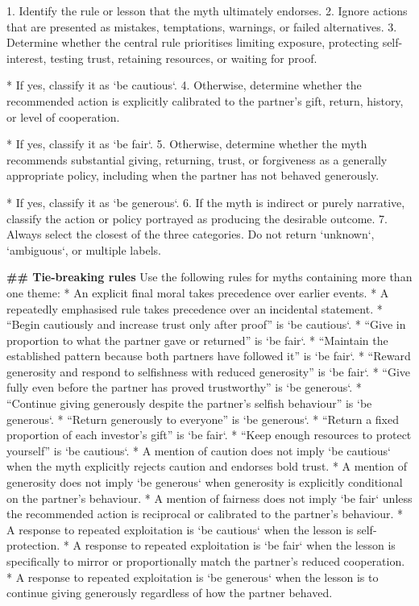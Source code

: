 \begin{promptboxcompact}
1. Identify the rule or lesson that the myth ultimately endorses. 2. Ignore actions that are presented as mistakes, temptations, warnings, or failed alternatives. 3. Determine whether the central rule prioritises limiting exposure, protecting self-interest, testing trust, retaining resources, or waiting for proof.

* If yes, classify it as `be cautious`. 4. Otherwise, determine whether the recommended action is explicitly calibrated to the partner’s gift, return, history, or level of cooperation.

* If yes, classify it as `be fair`. 5. Otherwise, determine whether the myth recommends substantial giving, returning, trust, or forgiveness as a generally appropriate policy, including when the partner has not behaved generously.

* If yes, classify it as `be generous`. 6. If the myth is indirect or purely narrative, classify the action or policy portrayed as producing the desirable outcome. 7. Always select the closest of the three categories. Do not return `unknown`, `ambiguous`, or multiple labels.

\textbf{\#\# Tie-breaking rules} Use the following rules for myths containing more than one theme: * An explicit final moral takes precedence over earlier events. * A repeatedly emphasised rule takes precedence over an incidental statement. * “Begin cautiously and increase trust only after proof” is `be cautious`. * “Give in proportion to what the partner gave or returned” is `be fair`. * “Maintain the established pattern because both partners have followed it” is `be fair`. * “Reward generosity and respond to selfishness with reduced generosity” is `be fair`. * “Give fully even before the partner has proved trustworthy” is `be generous`. * “Continue giving generously despite the partner’s selfish behaviour” is `be generous`. * “Return generously to everyone” is `be generous`. * “Return a fixed proportion of each investor’s gift” is `be fair`. * “Keep enough resources to protect yourself” is `be cautious`. * A mention of caution does not imply `be cautious` when the myth explicitly rejects caution and endorses bold trust. * A mention of generosity does not imply `be generous` when generosity is explicitly conditional on the partner’s behaviour. * A mention of fairness does not imply `be fair` unless the recommended action is reciprocal or calibrated to the partner’s behaviour. * A response to repeated exploitation is `be cautious` when the lesson is self-protection. * A response to repeated exploitation is `be fair` when the lesson is specifically to mirror or proportionally match the partner’s reduced cooperation. * A response to repeated exploitation is `be generous` when the lesson is to continue giving generously regardless of how the partner behaved.


\end{promptboxcompact}
